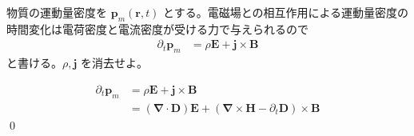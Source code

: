 \documentclass[uplatex,dvipdfmx,a4paper,11pt]{jlreq}
\makeatletter
\newcommand{\EE}{\bm{E}}
\newcommand{\DD}{\bm{D}}
\newcommand{\BB}{\bm{B}}
\newcommand{\HH}{\bm{H}}
\newcommand{\rr}{\bm{r}}
\newcommand{\pp}{\bm{p}}
\newcommand{\vnabla}{\mathbf{\nabla}}
\numberwithin{equation}{section}
\theoremstyle{definition}
\renewenvironment{proof}[1][\proofname]{\par
  \normalfont
  \topsep6\p@\@plus6\p@ \trivlist
  \item[\hskip\labelsep{\bfseries #1}\@addpunct{\bfseries}]\ignorespaces\quad\par
}{%
  \qed\endtrivlist\@endpefalse
}
\renewcommand\proofname{証明}
\makeatother
\begin{document}
\begin{problem}
物質の運動量密度を $\bm{p}_m(\rr, t)$ とする。電磁場との相互作用による運動量密度の時間変化は電荷密度と電流密度が受ける力で与えられるので
\begin{align}
  \partial_t \pp_m & = \rho\EE + \bm{j}\times\BB
\end{align}
と書ける。$\rho, \bm{j}$ を消去せよ。
\end{problem}
\begin{proof}
  \begin{align}
    \partial_t \pp_m & = \rho\EE + \bm{j}\times\BB                                          \\
                     & = (\vnabla\cdot\DD)\EE + (\vnabla\times\HH - \partial_t\DD)\times\BB
  \end{align}
\end{proof}
\end{document}
